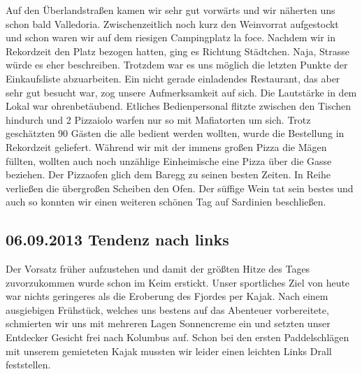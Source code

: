 Auf den Überlandstraßen kamen wir sehr gut vorwärts und wir näherten uns schon bald Valledoria.
Zwischenzeitlich noch kurz den Weinvorrat aufgestockt und schon waren wir auf dem riesigen Campingplatz la foce.
Nachdem wir in Rekordzeit den Platz bezogen hatten, ging es Richtung Städtchen.
Naja, Strasse würde es eher beschreiben.
Trotzdem war es uns möglich die letzten Punkte der Einkaufsliste abzuarbeiten.
Ein nicht gerade einladendes Restaurant, das aber sehr gut besucht war, zog unsere Aufmerksamkeit auf sich.
Die Lautstärke in dem Lokal war ohrenbetäubend.
Etliches Bedienpersonal flitzte zwischen den Tischen hindurch und 2 Pizzaiolo warfen nur so mit Mafiatorten um sich.
Trotz geschätzten 90 Gästen die alle bedient werden wollten, wurde die Bestellung in Rekordzeit geliefert.
Während wir mit der immens großen Pizza die Mägen füllten, wollten auch noch unzählige Einheimische eine Pizza über die Gasse beziehen.
Der Pizzaofen glich  dem Baregg zu seinen besten Zeiten.
In Reihe verließen die übergroßen Scheiben den Ofen.
Der süffige Wein tat sein bestes und auch so konnten wir einen weiteren schönen Tag auf Sardinien beschließen.  

\subsection{06.09.2013 Tendenz nach links} 
Der Vorsatz früher aufzustehen und damit der größten Hitze des Tages zuvorzukommen wurde schon im Keim erstickt.
Unser sportliches Ziel von heute war nichts geringeres als die Eroberung des Fjordes per Kajak.
Nach einem ausgiebigen Frühstück, welches uns bestens auf das Abenteuer vorbereitete, schmierten wir uns mit mehreren Lagen Sonnencreme ein und setzten unser Entdecker Gesicht frei nach Kolumbus auf.
Schon bei den ersten Paddelschlägen mit unserem gemieteten Kajak mussten wir leider einen leichten Links Drall feststellen.

